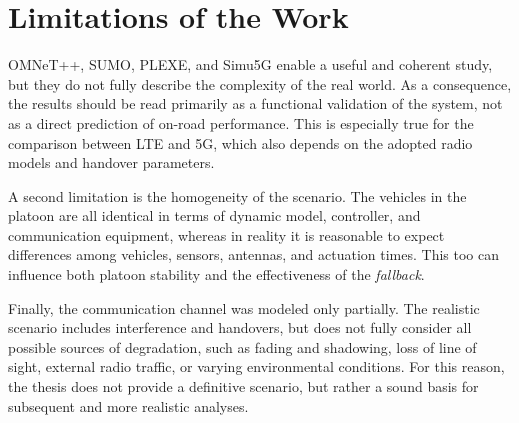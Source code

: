 \section{Limitations of the Work}

OMNeT++, SUMO, PLEXE, and Simu5G enable a useful and coherent study, but they do not fully describe the complexity of the real world. As a consequence, the results should be read primarily as a functional validation of the system, not as a direct prediction of on-road performance. This is especially true for the comparison between LTE and 5G, which also depends on the adopted radio models and handover parameters.

A second limitation is the homogeneity of the scenario. The vehicles in the platoon are all identical in terms of dynamic model, controller, and communication equipment, whereas in reality it is reasonable to expect differences among vehicles, sensors, antennas, and actuation times. This too can influence both platoon stability and the effectiveness of the \emph{fallback}.

Finally, the communication channel was modeled only partially. The realistic scenario includes interference and handovers, but does not fully consider all possible sources of degradation, such as fading and shadowing, loss of line of sight, external radio traffic, or varying environmental conditions. For this reason, the thesis does not provide a definitive scenario, but rather a sound basis for subsequent and more realistic analyses.
